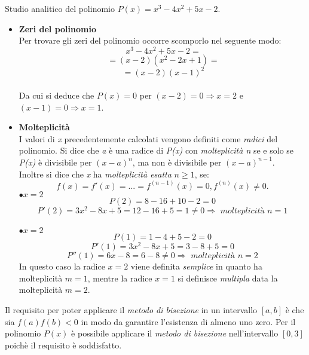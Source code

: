 \large\noindent{}

Studio analitico del polinomio $P(x) = x^3-4x^2+5x-2$.\\
\begin{itemize}
	\item \textbf{Zeri del polinomio}\\
		Per trovare gli zeri del polinomio occorre scomporlo nel seguente modo:
			\[
			\ x^3-4x^2+5x-2 =
			\] 
			\[
			\ = (x-2)(x^2-2x+1) =
			\]
			\[
			\ = (x-2)(x-1)^2
			\]\\
		Da cui si deduce che $P(x)=0$ per $(x-2)=0 \Rightarrow x=2$ e $(x-1)=0 \Rightarrow x=1$. \\
	\item \textbf{Molteplicità}\\
		I valori di \textit{x} precedentemente calcolati vengono definiti come \textit{radici} del polinomio. Si dice che \textit{a} è una radice di \textit{P(x)} con \textit{molteplicità n} se e solo se \textit{P(x)} è divisibile per $(x-a)^n$, ma non è divisibile per $(x-a)^{n-1}$.\\
		Inoltre si dice che \textit{x} ha \textit{molteplicità esatta} $n \geq 1$, se:
			\[
			f(x) = f'(x) = ... = f^{(n-1)}(x) = 0,  f^{(n)}(x) \neq 0.
			\]
				$\bullet x = 2 $ \\[0.5cm]
					\[
					P(2) = 8-16+10-2 = 0 
					\]
					\[
					P'(2) = 3x^2-8x+5 = 12-16+5 = 1 \neq 0 \Rightarrow \textit{ molteplicità } n=1
					\]\\
				$\bullet x = 2 $ \\[0.5cm]
					\[
					P(1) = 1-4+5-2 = 0 
					\]
					\[
					P'(1) = 3x^2-8x+5 = 3-8+5 = 0 
					\]
					\[
					P''(1) = 6x-8 = 6-8 \neq 0 \Rightarrow \textit{ molteplicità } n=2
					\]
		In questo caso la radice $x=2$ viene definita \textit{semplice} in quanto ha molteplicità $m=1$,
mentre la radice $x=1$ si definisce \textit{multipla} data la molteplicità $m=2$.\\ 
\end{itemize}
Il requisito per poter applicare il \textit{metodo di bisezione} in un intervallo $[a,b]$ è che sia $f(a)f(b)<0$ in modo da garantire l'esistenza di almeno uno zero. Per il polinomio $P(x)$ è possibile applicare il \textit{metodo di bisezione} nell'intervallo $[0,3]$ poichè il requisito è soddisfatto.
